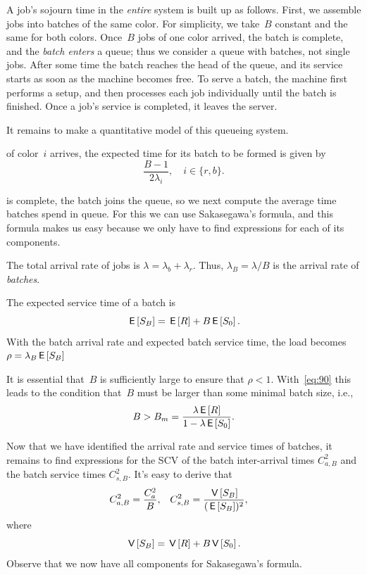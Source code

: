 \documentclass[queueing-book.tex]{subfiles}
\begin{document}
A job's sojourn time in the \emph{entire} system is built up as follows.
First, we assemble jobs into batches of the same color.
For simplicity, we take~$B$ constant and the same for both colors.
Once~$B$ jobs of one color arrived, the batch is complete, and the \emph{batch enters} a queue; thus we consider a queue with batches, not single jobs.
After some time the batch reaches the head of the queue, and its service starts as soon as the machine becomes free.
To serve a batch, the machine first performs a setup, and then processes each job individually until the batch is finished.
Once a job's service is completed, it leaves the server.

It remains to make a quantitative model of this queueing system.


 of color~$i$ arrives, the expected time for its batch to be formed is given by
\begin{equation}\label{eq:79}
\frac{B-1}{2\lambda_i}, \quad i\in \{r, b\}.
\end{equation}

 is complete, the batch joins the queue, so we next compute the average time batches spend in queue.
For this we can use Sakasegawa's formula, and this formula makes us easy because we only have to find expressions for each of its components.

The total arrival rate of jobs is $\lambda= \lambda_b+\lambda_r$. Thus, $\lambda_B=\lambda/B$ is the arrival rate of \emph{batches}.

The expected service time of a batch is
\begin{equation}\label{eq:90}
\,\mathsf{E}\left[S_B\right] = \,\mathsf{E}\left[R\right] + B\,\mathsf{E}\left[S_0\right].
\end{equation}
With the batch arrival rate and expected batch service time, the load becomes  $\rho = \lambda_B \,\mathsf{E}\left[S_B\right]$

It is essential that~$B$ is sufficiently large to ensure that $\rho<1$.
With~\cref{eq:90} this leads to the condition that~$B$ must be larger than some minimal batch size, i.e.,
\begin{equation*}
B> B_m = \frac{\lambda \,\mathsf{E}\left[R\right]}{1-\lambda \,\mathsf{E}\left[S_0\right]}.
\end{equation*}

Now that we have identified the arrival rate and service times of batches, it remains to find expressions for the SCV of the batch inter-arrival times $C_{a,B}^2$ and the batch service times $C_{s,B}^2$. It's easy to derive that
 \begin{align}\label{eq:82}
C_{a,B}^2 &= \frac{C_{a}^2}B, &
C_{s, B}^2 &= \frac{\,\mathsf{V}\left[S_B\right]}{(\,\mathsf{E}\left[S_B\right])^2},
\end{align}
where
\begin{equation*}
  \,\mathsf{V}\left[S_B\right] = \,\mathsf{V}\left[R\right]  + B \,\mathsf{V}\left[S_0\right].
\end{equation*}
Observe that we now have all components for Sakasegawa's formula.
\end{document}
